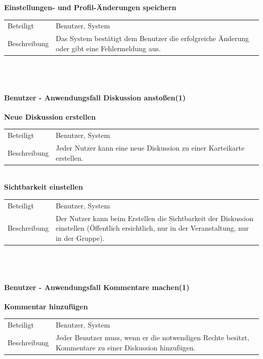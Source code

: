 \documentclass[12pt,a4paper]{article}
\begin{document}
\textbf{Einstellungen- und Profil-Änderungen speichern}\\
\begin{tabular}{l|p{12cm}}
\hline 
Beteiligt &  Benutzer, System \\ 
Beschreibung & Das System bestätigt dem Benutzer die erfolgreiche Änderung oder gibt eine Fehlermeldung aus. \\ 
\end{tabular}\\\


\paragraph{Benutzer - Anwendungsfall \glqq Diskussion anstoßen\grqq (1)}\mbox{}

\textbf{Neue Diskussion erstellen}\\
\begin{tabular}{l|p{12cm}}
\hline 
Beteiligt & Benutzer, System \\ 
Beschreibung & Jeder Nutzer kann eine neue Diskussion zu einer Karteikarte erstellen. \\ 
\end{tabular}\\

\textbf{Sichtbarkeit einstellen}\\
\begin{tabular}{l|p{12cm}}
\hline 
Beteiligt & Benutzer, System \\ 
Beschreibung & Der Nutzer kann beim Erstellen die Sichtbarkeit der Diskussion einstellen (Öffentlich ersichtlich, nur in der Veranstaltung, nur in der Gruppe). \\ 
\end{tabular}\\\\


\paragraph{Benutzer - Anwendungsfall \glqq Kommentare machen\grqq (1)}\mbox{}

\textbf{Kommentar hinzufügen}\\
\begin{tabular}{l|p{12cm}}
\hline 
Beteiligt & Benutzer, System \\ 
Beschreibung & Jeder Benutzer muss, wenn er die notwendigen Rechte besitzt, Kommentare zu einer Diskussion hinzufügen. \\ 
\end{tabular}\\\\ 
\end{document}
